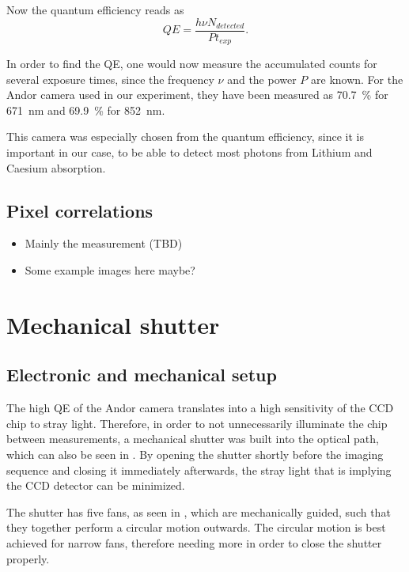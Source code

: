 Now the quantum efficiency reads as
\begin{equation}
QE = \frac{h \nu N_{detected}}{P t_{exp}}.
\end{equation}

In order to find the QE, one would now measure the accumulated counts for several exposure times, since the frequency $\nu$ and the power $P$ are known. For the Andor camera used in our experiment, they have been measured as \SI{70.7}{\percent} for \SI{671}{\nano\meter} and \SI{69.9}{\percent} for \SI{852}{\nano\meter}.

This camera was especially chosen from the quantum efficiency, since it is important in our case, to be able to detect most photons from Lithium and Caesium absorption.

\subsection{Pixel correlations}
\begin{itemize}
	\item Mainly the measurement (TBD)
	\item Some example images here maybe?
\end{itemize}

\section{Mechanical shutter}
\label{sec:shutter}

\subsection{Electronic and mechanical setup}
\label{subsec:shutter_electronic}

The high QE of the Andor camera translates into a high sensitivity of the CCD chip to stray light. Therefore, in order to not unnecessarily illuminate the chip between measurements, a mechanical shutter was built into the optical path, which can also be seen in . By opening the shutter shortly before the imaging sequence and closing it immediately afterwards, the stray light that is implying the CCD detector can be minimized.

The shutter has five fans, as seen in , which are mechanically guided, such that they together perform a circular motion outwards. The circular motion is best achieved for narrow fans, therefore needing more in order to close the shutter properly.

